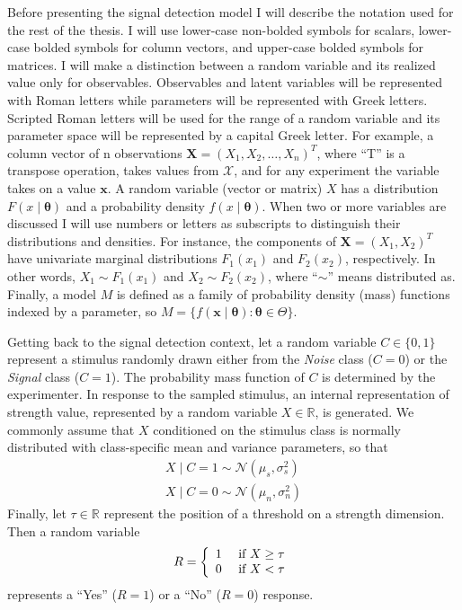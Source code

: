 \documentclass[12pt]{article}
\begin{document}
Before presenting the signal detection model I will describe the notation used for the rest of the thesis. I will use lower-case non-bolded symbols for scalars, lower-case bolded symbols for column vectors, and upper-case bolded symbols for matrices. I will make a distinction between a random variable and its realized value only for observables. Observables and  latent variables will be represented with Roman letters while parameters will be represented with Greek letters. Scripted Roman letters will be used for the range of a random variable and its parameter space will be represented by a capital Greek letter. For example, a column vector of n observations $\mathbf{X} = (X_1, X_2, \ldots, X_n)^T$, where ``T'' is a transpose operation, takes values from $\mathcal{X}$, and for any experiment the variable takes on a value $\mathbf{x}$. A random variable (vector or matrix) $X$ has a distribution $F(x \mid \mathbf{\theta})$ and a probability density $f(x \mid \mathbf{\theta})$. When two or more variables are discussed I will use numbers or letters as subscripts to distinguish their distributions and densities. For instance, the components of $\mathbf{X} = (X_1, X_2)^T$ have univariate marginal distributions $F_1(x_1)$ and $F_2(x_2)$, respectively. In other words, $X_1 \sim F_1(x_1)$ and $X_2 \sim F_2(x_2)$, where ``$\sim$'' means distributed as. Finally, a model $M$ is defined as a family of probability density (mass) functions indexed by a parameter, so $M = \{f(\mathbf{x} \mid \boldsymbol{\theta}) : \boldsymbol{\theta} \in \Theta\}$.

Getting back to the signal detection context, let a random variable $C \in \{0, 1\}$ represent a stimulus
randomly drawn either from the \textit{Noise} class ($C = 0$) or
the \textit{Signal} class ($C = 1$). The probability mass function of
$C$ is determined by the experimenter. In response to the sampled
stimulus, an internal representation of strength value, represented
by a random variable $X \in \mathbb{R}$, is generated. We commonly
assume that $X$ conditioned on the stimulus class is normally
distributed with class-specific mean and variance parameters, so that
%
\begin{align}\nonumber
X \mid C = 1 \sim \mathcal{N}(\mu_s, \sigma_s^2)\\
X \mid C = 0 \sim \mathcal{N}(\mu_n, \sigma_n^2)\end{align}
% 
Finally, let $\tau \in \mathbb{R}$ represent the position of a threshold on a strength dimension. Then a random variable
%
\begin{equation}
R = \left\{
	\begin{array}{l l}
     1 & \text{ if } X \geq \tau\\
     0 & \text{ if } X < \tau
     \end{array}\right.
\end{equation}
%
represents a ``Yes'' ($R=1$) or a ``No'' ($R=0$) response.
\end{document}
